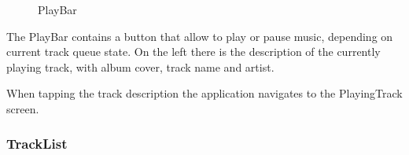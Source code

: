\documentclass{article}
\begin{document}
\begin{figure}[H]
	\noindent
	\caption{PlayBar} 
\end{figure}

The PlayBar contains a button that allow to play or pause music,
depending on current track queue state. On the left there is the description of
the currently playing track, with album cover, track name and artist.

When tapping the track description the application navigates to the PlayingTrack
screen.

\subsubsection{TrackList}
\end{document}
